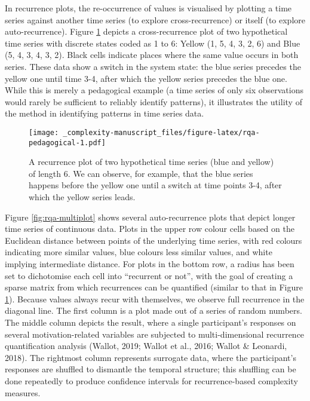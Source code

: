 \documentclass[
  british,
  man,floatsintext]{apa6}
\begin{document}
In recurrence plots, the re-occurrence of values is visualised by plotting a time series against another time series (to explore cross-recurrence) or itself (to explore auto-recurrence). Figure \ref{fig:rqa-pedagogical} depicts a cross-recurrence plot of two hypothetical time series with discrete states coded as 1 to 6: Yellow (1, 5, 4, 3, 2, 6) and Blue (5, 4, 3, 4, 3, 2). Black cells indicate places where the same value occurs in both series. These data show a switch in the system state: the blue series precedes the yellow one until time 3-4, after which the yellow series precedes the blue one. While this is merely a pedagogical example (a time series of only six observations would rarely be sufficient to reliably identify patterns), it illustrates the utility of the method in identifying patterns in time series data.

\begin{figure}
\centering
\texttt{[image: \_complexity-manuscript\_files/figure-latex/rqa-pedagogical-1.pdf]}
\caption{\label{fig:rqa-pedagogical}A recurrence plot of two hypothetical time series (blue and yellow) of length 6. We can observe, for example, that the blue series happens before the yellow one until a switch at time points 3-4, after which the yellow series leads.}
\end{figure}

Figure \ref{fig:rqa-multiplot} shows several auto-recurrence plots that depict longer time series of continuous data. Plots in the upper row colour cells based on the Euclidean distance between points of the underlying time series, with red colours indicating more similar values, blue colours less similar values, and white implying intermediate distance. For plots in the bottom row, a radius has been set to dichotomise each cell into \enquote{recurrent or not}, with the goal of creating a sparse matrix from which recurrences can be quantified (similar to that in Figure \ref{fig:rqa-pedagogical}). Because values always recur with themselves, we observe full recurrence in the diagonal line. The first column is a plot made out of a series of random numbers. The middle column depicts the result, where a single participant's responses on several motivation-related variables are subjected to multi-dimensional recurrence quantification analysis (Wallot, 2019; Wallot et al., 2016; Wallot \& Leonardi, 2018). The rightmost column represents surrogate data, where the participant's responses are shuffled to dismantle the temporal structure; this shuffling can be done repeatedly to produce confidence intervals for recurrence-based complexity measures.
\end{document}
